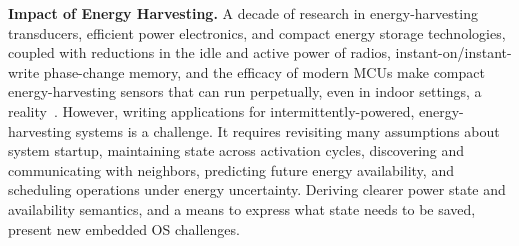 %

\smallskip\noindent
\textbf{Impact of Energy Harvesting.}
%
%
A decade of research in energy-harvesting transducers, efficient power
electronics, and compact energy storage technologies, coupled
with reductions in the idle and active power of radios,
instant-on/instant-write phase-change memory, and the efficacy of modern MCUs
make compact energy-harvesting sensors that can run perpetually, even in
indoor settings, a reality~\cite{doubledip}.
%
However, writing applications for intermittently-powered,
energy-harvesting systems is a challenge.  It requires revisiting many
assumptions about system startup, maintaining state across activation cycles,
discovering and communicating with neighbors, predicting future energy
availability, and scheduling operations under energy uncertainty.
%
Deriving clearer power state and availability semantics, and a means to express
what state needs to be saved, present new embedded OS challenges.


